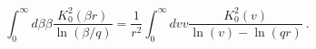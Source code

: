 \begin{equation}
\int_0^{\infty} d\beta \beta \frac{K^2_0(\beta r)}{\ln(\beta/q)}=\frac1{r^2}
\int_0^{\infty} dv v \frac{K^2_0(v)}{\ln(v)-\ln(qr)} \ .
\label{40}
\end{equation}

